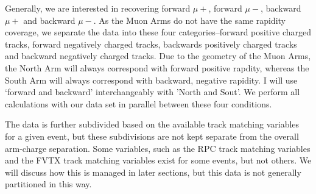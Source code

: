 Generally, we are interested in recovering forward $\mu+$, forward $\mu-$,
backward $\mu+$ and backward $\mu-$. As the Muon Arms do not have the same
rapidity coverage, we separate the data into these four categories--forward
positive charged tracks, forward negatively charged tracks, backwards positively
charged tracks and backward negatively charged tracks. Due to the geometry of
the Muon Arms, the North Arm will always correspond with forward positive
rapdity, whereas the South Arm will always correspond with backward, negative
rapidity. I will use `forward and backward' interchangeably with 'North and
Sout'. We perform all calculations with our data set in parallel between these
four conditions.

The data is further subdivided based on the available track matching variables
for a given event, but these subdivisions are not kept separate from the
overall arm-charge separation. Some variables, such as the RPC track matching
variables and the FVTX track matching variables exist for some events, but not
others. We will discuss how this is managed in later sections, but this data is
not generally partitioned in this way.

\clearpage
